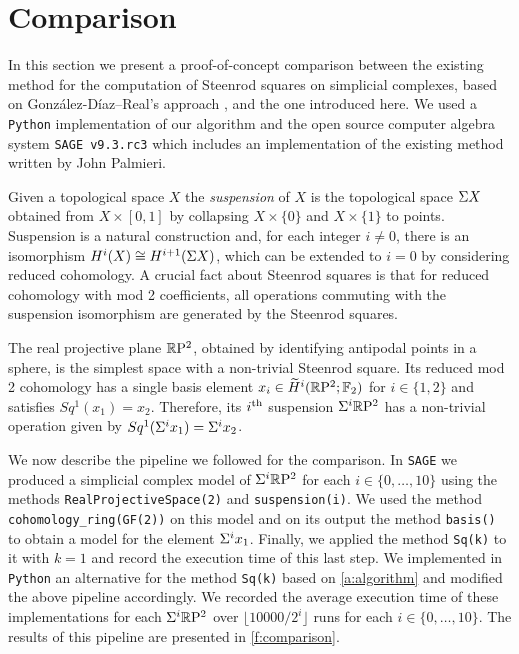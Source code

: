 
\section{Comparison} \label{s:comparison}

In this section we present a proof-of-concept comparison between the existing method for the computation of Steenrod squares on simplicial complexes, based on Gonz\'alez-D\'iaz--Real's approach \cite[Corollary 3.2]{gonzalez-diaz1999steenrod}, and the one introduced here.
We used a \verb|Python| implementation of our algorithm and the open source computer algebra system \verb|SAGE v9.3.rc3| \cite{sagemath} which includes an implementation of the existing method written by John Palmieri.

Given a topological space $X$ the \textit{suspension} of $X$ is the topological space $\Sigma X$ obtained from $X \times [0,1]$ by collapsing $X \times \{0\}$ and $X \times \{1\}$ to points.
Suspension is a natural construction and, for each integer $i \neq 0$, there is an isomorphism $H^i(X) \cong H^{i+1}(\Sigma X)$, which can be extended to $i = 0$ by considering reduced cohomology.
A crucial fact about Steenrod squares is that for reduced cohomology with mod 2 coefficients, all operations commuting with the suspension isomorphism are generated by the Steenrod squares.

The real projective plane $\mathbb{R}\mathrm{P}^2$, obtained by identifying antipodal points in a sphere, is the simplest space with a non-trivial Steenrod square.
Its reduced mod 2 cohomology has a single basis element $x_i \in \widetilde{H}^i(\mathbb{R}\mathrm{P}^2; {\mathbb{F}_2})$ for $i \in \{1, 2\}$ and satisfies $Sq^1(x_1) = x_2$.
Therefore, its $i^{\mathrm{th}}$ suspension $\Sigma^i \mathbb{R}\mathrm{P}^2$ has a non-trivial operation given by $Sq^1(\Sigma^i x_1) = \Sigma^i x_2$.

We now describe the pipeline we followed for the comparison.
In \verb|SAGE| we produced a simplicial complex model of $\Sigma^i \mathbb{R}\mathrm{P}^2$ for each $i \in \{0, \dots, 10\}$ using the methods \verb|RealProjectiveSpace(2)| and \verb|suspension(i)|.
We used the method \verb|cohomology_ring(GF(2))| on this model and on its output the method \verb|basis()| to obtain a model for the element $\Sigma^i x_1$.
Finally, we applied the method \verb|Sq(k)| to it with $k=1$ and record the execution time of this last step.
We implemented in \verb|Python| an alternative for the method \verb|Sq(k)| based on \cref{a:algorithm} and modified the above pipeline accordingly.
We recorded the average execution time of these implementations for each $\Sigma^i \mathbb{R}\mathrm{P}^2$ over $\lfloor 10000/2^i \rfloor$ runs for each $i \in \{0, \dots, 10\}$.
The results of this pipeline are presented in \cref{f:comparison}.


